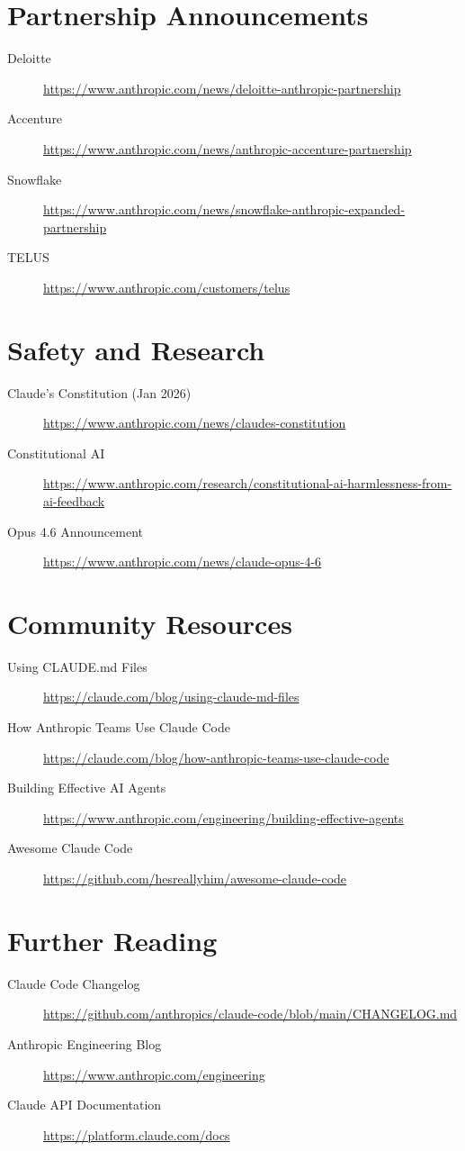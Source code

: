 \section{Partnership Announcements}

\begin{description}
  \item[Deloitte] \url{https://www.anthropic.com/news/deloitte-anthropic-partnership}
  \item[Accenture] \url{https://www.anthropic.com/news/anthropic-accenture-partnership}
  \item[Snowflake] \url{https://www.anthropic.com/news/snowflake-anthropic-expanded-partnership}
  \item[TELUS] \url{https://www.anthropic.com/customers/telus}
\end{description}

\section{Safety and Research}

\begin{description}
  \item[Claude's Constitution (Jan 2026)] \url{https://www.anthropic.com/news/claudes-constitution}
  \item[Constitutional AI] \url{https://www.anthropic.com/research/constitutional-ai-harmlessness-from-ai-feedback}
  \item[Opus 4.6 Announcement] \url{https://www.anthropic.com/news/claude-opus-4-6}
\end{description}

\section{Community Resources}

\begin{description}
  \item[Using CLAUDE.md Files] \url{https://claude.com/blog/using-claude-md-files}
  \item[How Anthropic Teams Use Claude Code] \url{https://claude.com/blog/how-anthropic-teams-use-claude-code}
  \item[Building Effective AI Agents] \url{https://www.anthropic.com/engineering/building-effective-agents}
  \item[Awesome Claude Code] \url{https://github.com/hesreallyhim/awesome-claude-code}
\end{description}

\section{Further Reading}

\begin{description}
  \item[Claude Code Changelog] \url{https://github.com/anthropics/claude-code/blob/main/CHANGELOG.md}
  \item[Anthropic Engineering Blog] \url{https://www.anthropic.com/engineering}
  \item[Claude API Documentation] \url{https://platform.claude.com/docs}
\end{description}
